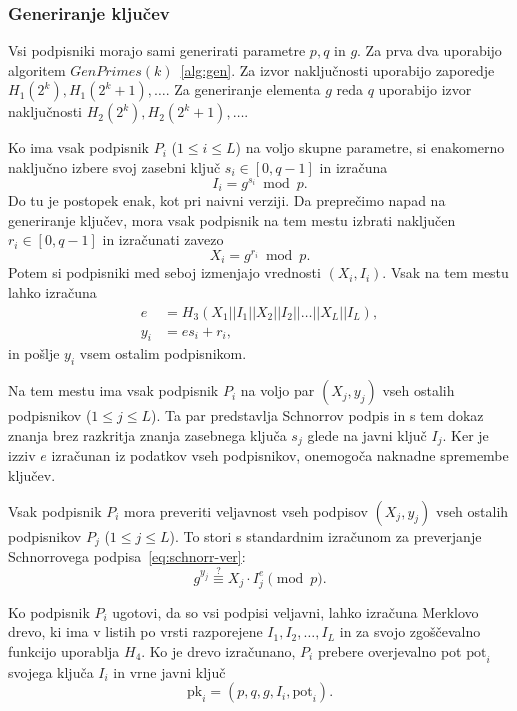 \documentclass[isrm2, tisk]{fmfdelo}
\begin{document}
\subsubsection{Generiranje ključev}
Vsi podpisniki morajo sami generirati parametre $p, q$ in $g$. Za prva dva uporabijo algoritem 
$GenPrimes(k)$~\ref{alg:gen}. Za izvor naključnosti uporabijo zaporedje $H_1(2^k), H_1(2^k + 1), \dots$.
Za generiranje elementa $g$ reda $q$ uporabijo izvor naključnosti $H_2(2^k), H_2(2^k + 1), \dots$.

Ko ima vsak podpisnik $P_i$ ($1 \le i \le L$) na voljo skupne parametre, si enakomerno naključno
izbere svoj zasebni ključ $s_i \in [0, q - 1]$ in izračuna
$$ 
I_i = g^{s_i} \bmod p.
$$
Do tu je postopek enak, kot pri naivni verziji. Da preprečimo napad na generiranje ključev, mora 
vsak podpisnik na tem mestu izbrati naključen $r_i \in [0, q- 1]$ in izračunati zavezo
$$ 
X_i = g^{r_i} \bmod p.
$$
Potem si podpisniki med seboj izmenjajo vrednosti $(X_i, I_i)$. Vsak na tem mestu lahko izračuna
\begin{align*}
    e &= H_3(X_1 || I_1 || X_2 || I_2 || \dots || X_L || I_L), \\
    y_i &= e s_i + r_i,
\end{align*}
in pošlje $y_i$ vsem ostalim podpisnikom.

Na tem mestu ima vsak podpisnik $P_i$ na voljo par $(X_j, y_j)$ vseh ostalih podpisnikov ($1 \le j
\le L$). Ta par predstavlja Schnorrov podpis in s tem dokaz znanja brez razkritja znanja zasebnega
ključa $s_j$ glede na javni ključ $I_j$. Ker je izziv $e$ izračunan iz podatkov vseh podpisnikov,
onemogoča naknadne spremembe ključev. 

Vsak podpisnik $P_i$ mora preveriti veljavnost vseh podpisov $(X_j, y_j)$ vseh ostalih podpisnikov
$P_j$ ($1 \le j \le L$). To stori s standardnim izračunom za preverjanje Schnorrovega 
podpisa~\eqref{eq:schnorr-ver}: 
$$
g^{y_j} \stackrel{?}{\equiv} X_j \cdot I_j^{e} \pmod p.
$$

Ko podpisnik $P_i$ ugotovi, da so vsi podpisi veljavni, lahko izračuna Merklovo drevo, ki ima v 
listih po vrsti razporejene $I_1, I_2, \dots, I_L$ in za svojo zgoščevalno funkcijo uporablja $H_4$.
Ko je drevo izračunano, $P_i$ prebere overjevalno pot $\text{pot}_i$ svojega ključa $I_i$ in vrne 
javni ključ
$$ 
\text{pk}_i = (p, q, g, I_i, \text{pot}_i).
$$
\end{document}
